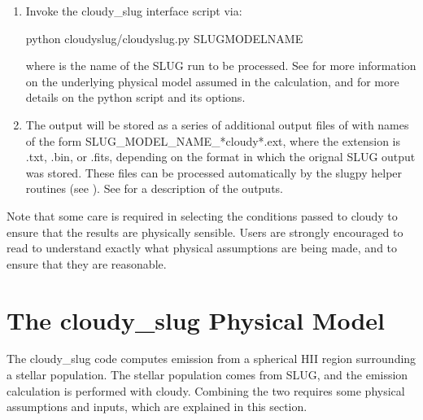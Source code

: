 \documentclass[letterpaper,10pt,english]{sphinxmanual}
\begin{document}
\begin{enumerate}
\item {} 
Invoke the cloudy\_slug interface script via:

\begin{sphinxVerbatim}[commandchars=\\\{\}]
python cloudy\PYGZus{}slug/cloudy\PYGZus{}slug.py SLUG\PYGZus{}MODEL\PYGZus{}NAME
\end{sphinxVerbatim}

where  is the name of the SLUG run to be
processed. See {\hyperref[\detokenize{cloudy:ssec-cloudy-model}]{}} for more information on
the underlying physical model assumed in the calculation, and
{\hyperref[\detokenize{cloudy:ssec-cloudy-slug-options}]{}} for more details on the python
script and its options.

\item {} 
The output will be stored as a series of additional output files of
with names of the form SLUG\_MODEL\_NAME\_*cloudy*.ext, where the
extension is .txt, .bin, or .fits, depending on the format in which
the orignal SLUG output was stored. These files can be processed
automatically by the slugpy helper routines (see
{\hyperref[\detokenize{slugpy:sec-slugpy}]{}}). See {\hyperref[\detokenize{cloudy:ssec-cloudy-output}]{}} for a description
of the outputs.

\end{enumerate}

Note that some care is required in selecting the conditions passed to
cloudy to ensure that the results are physically sensible. Users are
strongly encouraged to read {\hyperref[\detokenize{cloudy:ssec-cloudy-model}]{}} to understand
exactly what physical assumptions are being made, and to ensure that
they are reasonable.


\section{The cloudy\_slug Physical Model}
\label{\detokenize{cloudy:ssec-cloudy-model}}\label{\detokenize{cloudy:the-cloudy-slug-physical-model}}
The cloudy\_slug code computes emission from a spherical HII region
surrounding a stellar population. The stellar population comes from
SLUG, and the emission calculation is performed with cloudy. Combining
the two requires some physical assumptions and inputs, which are
explained in this section.
\end{document}
